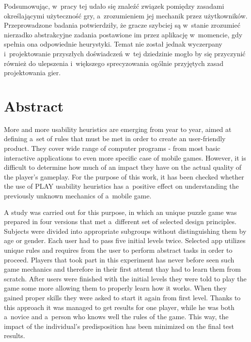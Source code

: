 \documentclass[a4paper,12pt,numbers=noenddot]{report}
\begin{document}
Podsumowując, w~pracy tej udało się znaleźć związek pomiędzy zasadami określającymi użyteczność gry, a~zrozumieniem jej mechanik przez użytkowników. Przeprowadzone badania potwierdziły, że gracze szybciej są w~stanie zrozumieć nierzadko abstrakcyjne zadania postawione im przez aplikację w~momencie, gdy spełnia ona odpowiednie heurystyki. Temat nie został jednak wyczerpany i~projektowanie przyszłych doświadczeń w~tej dziedzinie mogło by się przyczynić również do ulepszenia i~większego sprecyzowania ogólnie przyjętych zasad projektowania gier.



\chapter{Abstract}


More and more usability heuristics are emerging from year to year, aimed at defining a~set of rules that must be met in order to create an user-friendly product. They cover wide range of computer programs - from most basic interactive applications to even more specific case of mobile games. However, it is difficult to determine how much of an impact they have on the actual quality of the player's gameplay. For the purpose of this work, it has been checked whether the use of PLAY usability heuristics has a~positive effect on understanding the previously unknown mechanics of a~mobile game.

A study was carried out for this purpose, in which an unique puzzle game was prepared in four versions that met a~different set of selected design principles. Subjects were divided into appropriate subgroups without distinguishing them by age or gender. Each user had to pass five initial levels twice. Selected app utilizes unique rules and requires from the user to perform abstract tasks in order to proceed. Players that took part in this experiment has never before seen such game mechanics and therefore in their first attemt thay had to learn them from scratch. After users were finished with the initial levels they were told to play the game some more allowing them to properly learn how it works. When they gained proper skills they were asked to start it again from first level. Thanks to this approach it was managed to get results for one player, while he was both a~novice and a~person who knows well the rules of the game. This way, the impact of the individual's predisposition has been minimized on the final test results.
\end{document}
